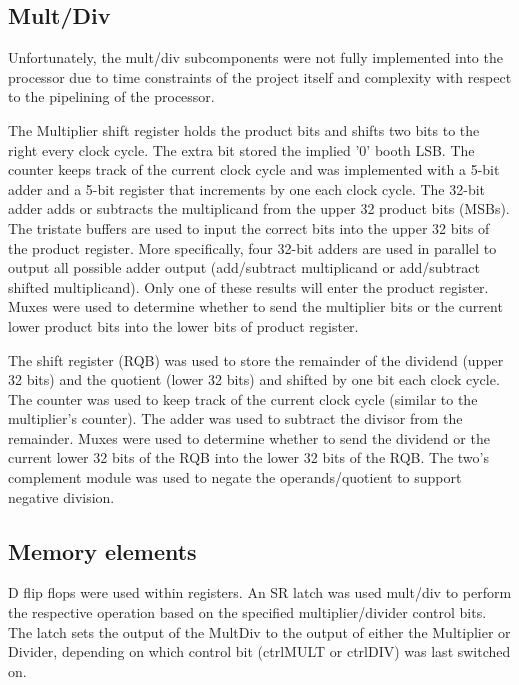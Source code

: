 \documentclass[a4paper,11pt]{article}
\begin{document}
\subsection*{Mult/Div}

Unfortunately, the mult/div subcomponents were not fully implemented into the processor due to time constraints of the project itself and complexity with respect to the pipelining of the processor.

The Multiplier shift register holds the product bits and shifts two bits to the right every clock cycle. The extra bit stored the implied '0' booth LSB. The counter keeps track of the current clock cycle and was implemented with a 5-bit adder and a 5-bit register that increments by one each clock cycle. The 32-bit adder adds or subtracts the multiplicand from the upper 32 product bits (MSBs). The tristate buffers are used to input the correct bits into the upper 32 bits of the product register. More specifically, four 32-bit adders are used in parallel to output all possible adder output (add/subtract multiplicand or add/subtract shifted multiplicand). Only one of these results will enter the product register. Muxes were used to determine whether to send the multiplier bits or the current lower product bits into the lower bits of product register.

The shift register (RQB) was used to store the remainder of the dividend (upper 32 bits) and the quotient (lower 32 bits) and shifted by one bit each clock cycle. The counter was used to keep track of the current clock cycle (similar to the multiplier's counter). The adder was used to subtract the divisor from the remainder. Muxes were used to determine whether to send the dividend or the current lower 32 bits of the RQB into the lower 32 bits of the RQB. The two's complement module was used to negate the operands/quotient to support negative division.

\subsection*{Memory elements}

D flip flops were used within registers. An SR latch was used mult/div to perform the respective operation based on the specified multiplier/divider control bits. The latch sets the output of the MultDiv to the output of either the Multiplier or Divider, depending on which control bit (ctrlMULT or ctrlDIV) was last switched on. 


\newpage
\end{document}
